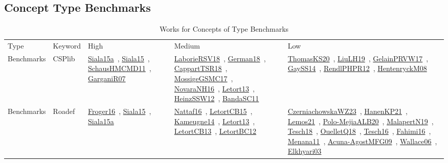 \clearpage
\subsection{Concept Type Benchmarks}
\label{sec:Benchmarks}
{\scriptsize
\begin{longtable}{lp{3cm}>{\raggedright\arraybackslash}p{6cm}>{\raggedright\arraybackslash}p{6cm}>{\raggedright\arraybackslash}p{8cm}}
\rowcolor{white}\caption{Works for Concepts of Type Benchmarks}\\ \toprule
\rowcolor{white}Type & Keyword & High & Medium & Low\\ \midrule\endhead
\bottomrule
\endfoot
Benchmarks & CSPlib & \href{../works/Siala15a.pdf}{Siala15a}~\cite{Siala15a}, \href{../works/Siala15.pdf}{Siala15}~\cite{Siala15}, \href{../works/SchausHMCMD11.pdf}{SchausHMCMD11}~\cite{SchausHMCMD11}, \href{../works/GarganiR07.pdf}{GarganiR07}~\cite{GarganiR07} & \href{../works/LaborieRSV18.pdf}{LaborieRSV18}~\cite{LaborieRSV18}, \href{../works/German18.pdf}{German18}~\cite{German18}, \href{../works/CappartTSR18.pdf}{CappartTSR18}~\cite{CappartTSR18}, \href{../works/MossigeGSMC17.pdf}{MossigeGSMC17}~\cite{MossigeGSMC17}, \href{../works/NovaraNH16.pdf}{NovaraNH16}~\cite{NovaraNH16}, \href{../works/Letort13.pdf}{Letort13}~\cite{Letort13}, \href{../works/HeinzSSW12.pdf}{HeinzSSW12}~\cite{HeinzSSW12}, \href{../works/BandaSC11.pdf}{BandaSC11}~\cite{BandaSC11} & \href{../works/ThomasKS20.pdf}{ThomasKS20}~\cite{ThomasKS20}, \href{../works/LiuLH19.pdf}{LiuLH19}~\cite{LiuLH19}, \href{../works/GelainPRVW17.pdf}{GelainPRVW17}~\cite{GelainPRVW17}, \href{../works/GaySS14.pdf}{GaySS14}~\cite{GaySS14}, \href{../works/RendlPHPR12.pdf}{RendlPHPR12}~\cite{RendlPHPR12}, \href{../works/HentenryckM08.pdf}{HentenryckM08}~\cite{HentenryckM08}\\
Benchmarks & Roadef & \href{../works/Froger16.pdf}{Froger16}~\cite{Froger16}, \href{../works/Siala15.pdf}{Siala15}~\cite{Siala15}, \href{../works/Siala15a.pdf}{Siala15a}~\cite{Siala15a} & \href{../works/Nattaf16.pdf}{Nattaf16}~\cite{Nattaf16}, \href{../works/LetortCB15.pdf}{LetortCB15}~\cite{LetortCB15}, \href{../works/Kameugne14.pdf}{Kameugne14}~\cite{Kameugne14}, \href{../works/Letort13.pdf}{Letort13}~\cite{Letort13}, \href{../works/LetortCB13.pdf}{LetortCB13}~\cite{LetortCB13}, \href{../works/LetortBC12.pdf}{LetortBC12}~\cite{LetortBC12} & \href{../works/CzerniachowskaWZ23.pdf}{CzerniachowskaWZ23}~\cite{CzerniachowskaWZ23}, \href{../works/HanenKP21.pdf}{HanenKP21}~\cite{HanenKP21}, \href{../works/Lemos21.pdf}{Lemos21}~\cite{Lemos21}, \href{../works/Polo-MejiaALB20.pdf}{Polo-MejiaALB20}~\cite{Polo-MejiaALB20}, \href{../works/MalapertN19.pdf}{MalapertN19}~\cite{MalapertN19}, \href{../works/Tesch18.pdf}{Tesch18}~\cite{Tesch18}, \href{../works/OuelletQ18.pdf}{OuelletQ18}~\cite{OuelletQ18}, \href{../works/Tesch16.pdf}{Tesch16}~\cite{Tesch16}, \href{../works/Fahimi16.pdf}{Fahimi16}~\cite{Fahimi16}, \href{../works/Menana11.pdf}{Menana11}~\cite{Menana11}, \href{../works/Acuna-AgostMFG09.pdf}{Acuna-AgostMFG09}~\cite{Acuna-AgostMFG09}, \href{../works/Wallace06.pdf}{Wallace06}~\cite{Wallace06}, \href{../works/Elkhyari03.pdf}{Elkhyari03}~\cite{Elkhyari03}\\

\end{longtable}}
